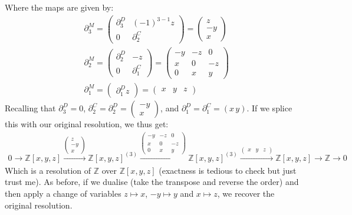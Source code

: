 \documentclass[12pt]{book}
\theoremstyle{definition}
\begin{document}
Where the maps are given by: 
\begin{align*}
    &\partial^M_3 = 
    \begin{pmatrix}
        \partial^D_3 & (-1)^{3-1}z\\
        0            & \partial^C_2
    \end{pmatrix}
    = 
    \begin{pmatrix}
        z\\
        -y\\
        x
    \end{pmatrix}\\
    &\partial^M_2 =
    \begin{pmatrix}
        \partial^D_2 & -z \\
        0            & \partial^C_1
    \end{pmatrix}
    = 
    \begin{pmatrix}
        -y & -z & 0 \\
        x  & 0  & -z \\
        0  & x  & y 
    \end{pmatrix}\\
    &\partial^M_1 =
    \begin{pmatrix}
        \partial^D_1 z
    \end{pmatrix}
    =
    \begin{pmatrix}
        x & y & z
    \end{pmatrix}
\end{align*}
Recalling that $\partial^D_3 = 0$, $\partial^C_2 = \partial^D_2 = \begin{pmatrix}
    -y \\
    x
\end{pmatrix}$, and $\partial^D_1 = \partial^C_1 = (x \, y)$. If we splice this with our original resolution, we thus get:
\begin{align*}
        0 \rightarrow \mathbb{Z}[x,y,z] \xrightarrow{\left(\begin{smallmatrix} z \\ -y \\ x \end{smallmatrix}\right)} \mathbb{Z}[x,y,z]^{(3)} \xrightarrow{\left(\begin{smallmatrix}
        -y & -z & 0 \\ x  & 0  & -z \\ 0  & x  & y \end{smallmatrix}\right)} \mathbb{Z}[x,y,z]^{(3)} \xrightarrow{\left(\begin{smallmatrix} x & y & z \end{smallmatrix} \right)} \mathbb{Z}[x,y,z] \rightarrow \mathbb{Z} \rightarrow 0 
\end{align*}
Which is a resolution of $\mathbb{Z}$ over $\mathbb{Z}[x,y,z]$ (exactness is tedious to check but just trust me). As before, if we dualise (take the transpose and reverse the order) and then apply a change of variables $z \mapsto x$, $-y \mapsto y$ and $x \mapsto z$, we recover the original resolution. \\
\end{document}
